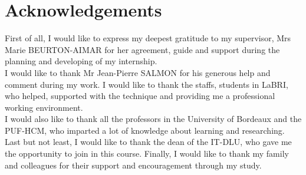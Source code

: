 \chapter*{Acknowledgements}
\thispagestyle{empty}
\indent First of all, I would like to express my deepest gratitude to my supervisor, Mrs Marie BEURTON-AIMAR for her agreement, guide and support during the planning and developing of my internship.\\[0.3cm]
I would like to thank Mr Jean-Pierre SALMON for his generous help and comment during my work. I would like to thank the staffs, students in LaBRI, who helped, supported with the technique and providing me a professional working environment. 
\\[0.3cm]
I would also like to thank all the professors in the University of Bordeaux and the PUF-HCM, who imparted a lot of knowledge about learning and researching. Last but not least, I would like to thank the dean of the IT-DLU, who gave me the opportunity to join in this course. 
Finally, I would like to thank my family and colleagues for their support and encouragement through my study.
\clearpage